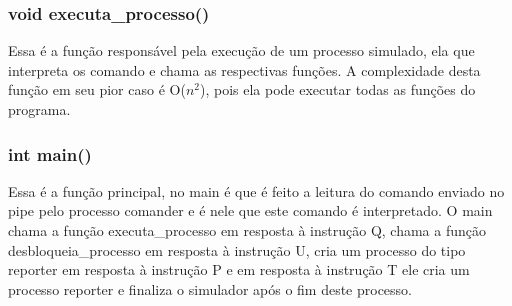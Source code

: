 \documentclass[a4paper, 12pt]{article}
\begin{document}
 \subsubsection{void executa\_processo()}
    Essa é a função responsável pela execução de um processo simulado, ela que interpreta os comando e chama as respectivas funções. A complexidade desta função em seu pior caso é O($n^2$), pois ela pode executar todas as funções do programa.
    
 \subsubsection{int main()}
    Essa é a função principal, no main é que é feito a leitura do comando enviado no pipe pelo processo comander e é nele que este comando é interpretado. O main chama a função executa\_processo em resposta à instrução Q, chama a função desbloqueia\_processo em resposta à instrução U, cria um processo do tipo reporter em resposta à instrução P e em resposta à instrução T ele cria um processo reporter e finaliza o simulador após o fim deste processo. 
\newpage
\end{document}
